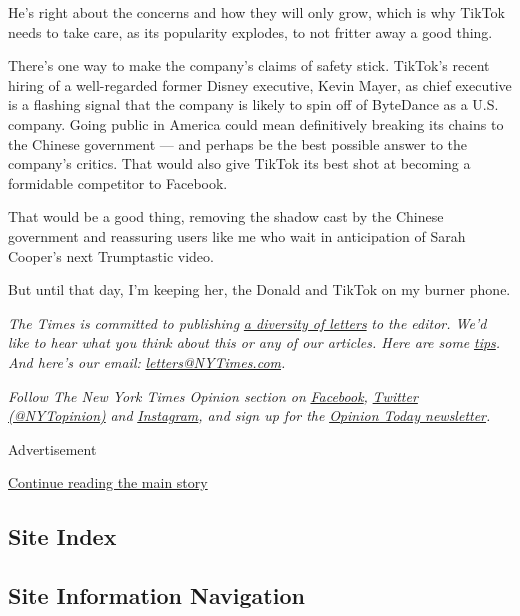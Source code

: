 He's right about the concerns and how they will only grow, which is why
TikTok needs to take care, as its popularity explodes, to not fritter
away a good thing.

There's one way to make the company's claims of safety stick. TikTok's
recent hiring of a well-regarded former Disney executive, Kevin Mayer,
as chief executive is a flashing signal that the company is likely to
spin off of ByteDance as a U.S. company. Going public in America could
mean definitively breaking its chains to the Chinese government --- and
perhaps be the best possible answer to the company's critics. That would
also give TikTok its best shot at becoming a formidable competitor to
Facebook.

That would be a good thing, removing the shadow cast by the Chinese
government and reassuring users like me who wait in anticipation of
Sarah Cooper's next Trumptastic video.

But until that day, I'm keeping her, the Donald and TikTok on my burner
phone.

\emph{The Times is committed to publishing}
\href{https://www.nytimes3xbfgragh.onion/2019/01/31/opinion/letters/letters-to-editor-new-york-times-women.html}{\emph{a
diversity of letters}} \emph{to the editor. We'd like to hear what you
think about this or any of our articles. Here are some}
\href{https://help.nytimes3xbfgragh.onion/hc/en-us/articles/115014925288-How-to-submit-a-letter-to-the-editor}{\emph{tips}}\emph{.
And here's our email:}
\href{mailto:letters@NYTimes.com}{\emph{letters@NYTimes.com}}\emph{.}

\emph{Follow The New York Times Opinion section on}
\href{https://www.facebookcorewwwi.onion/nytopinion}{\emph{Facebook}}\emph{,}
\href{http://twitter.com/NYTOpinion}{\emph{Twitter (@NYTopinion)}}
\emph{and}
\href{https://www.instagram.com/nytopinion/}{\emph{Instagram}}\emph{,
and sign up for the}
\href{http://www.nytimes3xbfgragh.onion/newsletters/opiniontoday/}{\emph{Opinion
Today newsletter}}\emph{.}

Advertisement

\protect\hyperlink{after-bottom}{Continue reading the main story}

\hypertarget{site-index}{%
\subsection{Site Index}\label{site-index}}

\hypertarget{site-information-navigation}{%
\subsection{Site Information
Navigation}\label{site-information-navigation}}

